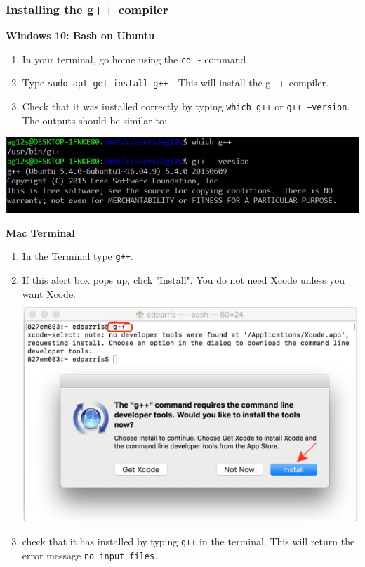 \documentclass{if-beamer}
\begin{document}
\begin{frame}
\frametitle{Installing the g++ compiler}
\begin{minipage}[t]{0.45\textwidth}
	\flushleft
	\textbf{Windows 10: Bash on Ubuntu}
	\begin{enumerate}
		\item In your terminal, go home using the \texttt{cd \textasciitilde} command
		\item Type \texttt{sudo apt-get install g++} - This will install the g++ compiler.
		\item Check that it was installed correctly by typing \texttt{which g++} or \texttt{g++ --version}. The outputs should be similar to:
	\end{enumerate}
\includegraphics[width = \textwidth]{figures/g++Check}
\end{minipage}
\begin{minipage}[t]{.45\textwidth}
	\textbf{Mac Terminal}
	\begin{enumerate}
		\item In the Terminal type \texttt{g++}.
		\item If this alert box pops up, click "Install". You do not need Xcode unless you want Xcode.
		\includegraphics[scale = 0.25]{figures/g++Iterm}
		\item check that it has installed by typing \texttt{g++} in the terminal. This will return the error message \texttt{no input files}.
	\end{enumerate}
\end{minipage}
\end{frame}
\end{document}
